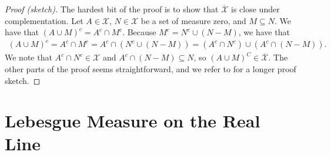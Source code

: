 \documentclass[10pt]{article}
\newcommand{\mcal}[1]{\mathcal{#1}}
\begin{document}
\begin{itemize}
  \begin{proof}[Proof (sketch)]
    The hardest bit of the proof is to show that $\overline{\mcal{X}}$ is close under complementation. Let $A \in \mcal{X}$, $N \in \mcal{X}$ be a set of measure zero, and $M \subseteq N$. We have that $(A \cup M)^c = A^c \cap M^c$. Because $M^c = N^c \cup (N - M)$, we have that
    \begin{align*}
      (A \cup M)^c = A^c \cap M^c = A^c \cap ( N^c \cup (N-M) ) = (A^c \cap N^c) \cup (A^c \cap (N-M)).
    \end{align*}
    We note that $A^c \cap N^c \in \mcal{X}$ and $A^c \cap (N - M) \subseteq N$, so $(A \cup M)^C \in \overline{\mcal{X}}$. The other parts of the proof seems straightforward, and we refer to \cite{Hunter:2011} for a longer proof sketch.
  \end{proof}
\end{itemize}

\section{Lebesgue Measure on the Real Line}
\end{document}

